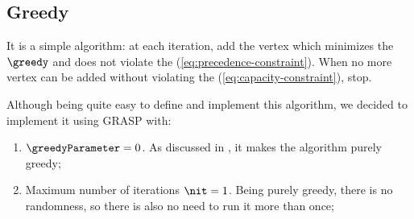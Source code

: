 \subsection{Greedy}

It is a simple algorithm: at each iteration, add the vertex which minimizes the \greedyCriteriaText $\greedy$ and does not violate the \precedenceConstraint (\eqref{eq:precedence-constraint}). When no more vertex can be added without violating the \capacityConstraint (\eqref{eq:capacity-constraint}), stop.

Although being quite easy to define and implement this algorithm, we decided to implement it using GRASP with:

\begin{enumerate}
    \item \greedyParameterText $\greedyParameter = 0$. As discussed in , it makes the algorithm purely greedy;
    \item Maximum number of iterations $\nit = 1$. Being purely greedy, there is no randomness, so there is also no need to run it more than once;
\end{enumerate}

